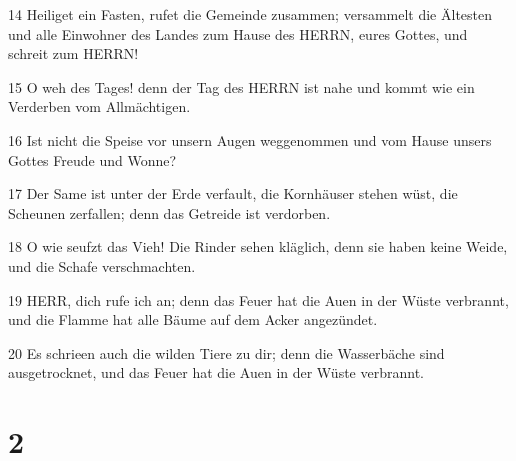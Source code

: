 \par 14 Heiliget ein Fasten, rufet die Gemeinde zusammen; versammelt die Ältesten und alle Einwohner des Landes zum Hause des HERRN, eures Gottes, und schreit zum HERRN!
\par 15 O weh des Tages! denn der Tag des HERRN ist nahe und kommt wie ein Verderben vom Allmächtigen.
\par 16 Ist nicht die Speise vor unsern Augen weggenommen und vom Hause unsers Gottes Freude und Wonne?
\par 17 Der Same ist unter der Erde verfault, die Kornhäuser stehen wüst, die Scheunen zerfallen; denn das Getreide ist verdorben.
\par 18 O wie seufzt das Vieh! Die Rinder sehen kläglich, denn sie haben keine Weide, und die Schafe verschmachten.
\par 19 HERR, dich rufe ich an; denn das Feuer hat die Auen in der Wüste verbrannt, und die Flamme hat alle Bäume auf dem Acker angezündet.
\par 20 Es schrieen auch die wilden Tiere zu dir; denn die Wasserbäche sind ausgetrocknet, und das Feuer hat die Auen in der Wüste verbrannt.

\chapter{2}

